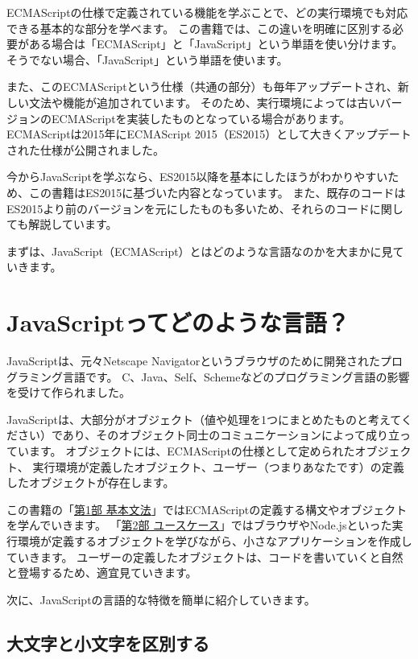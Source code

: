ECMAScriptの仕様で定義されている機能を学ぶことで、どの実行環境でも対応できる基本的な部分を学べます。
この書籍では、この違いを明確に区別する必要がある場合は「ECMAScript」と「JavaScript」という単語を使い分けます。
そうでない場合、「JavaScript」という単語を使います。

また、このECMAScriptという仕様（共通の部分）も毎年アップデートされ、新しい文法や機能が追加されています。
そのため、実行環境によっては古いバージョンのECMAScriptを実装したものとなっている場合があります。
ECMAScriptは2015年にECMAScript 2015（ES2015）として大きくアップデートされた仕様が公開されました。

今からJavaScriptを学ぶなら、ES2015以降を基本にしたほうがわかりやすいため、この書籍はES2015に基づいた内容となっています。
また、既存のコードはES2015より前のバージョンを元にしたものも多いため、それらのコードに関しても解説しています。

まずは、JavaScript（ECMAScript）とはどのような言語なのかを大まかに見ていきます。

\hypertarget{about-javascript}{%
\section{JavaScriptってどのような言語？}\label{about-javascript}}

JavaScriptは、元々Netscape Navigatorというブラウザのために開発されたプログラミング言語です。
C、Java、Self、Schemeなどのプログラミング言語の影響を受けて作られました。

JavaScriptは、大部分がオブジェクト（値や処理を1つにまとめたものと考えてください）であり、そのオブジェクト同士のコミュニケーションによって成り立っています。
オブジェクトには、ECMAScriptの仕様として定められたオブジェクト、
実行環境が定義したオブジェクト、ユーザー（つまりあなたです）の定義したオブジェクトが存在します。

この書籍の「\hyperlink{basic-grammar}{第1部 基本文法}」ではECMAScriptの定義する構文やオブジェクトを学んでいきます。
「\hyperlink{use-case}{第2部 ユースケース}」ではブラウザやNode.jsといった実行環境が定義するオブジェクトを学びながら、小さなアプリケーションを作成していきます。
ユーザーの定義したオブジェクトは、コードを書いていくと自然と登場するため、適宜見ていきます。

次に、JavaScriptの言語的な特徴を簡単に紹介していきます。

\hypertarget{case-sensitive}{%
\subsection{大文字と小文字を区別する}\label{case-sensitive}}


